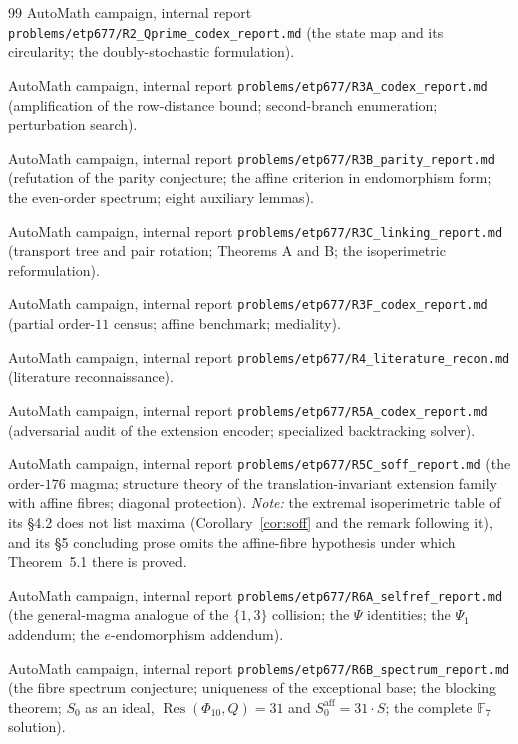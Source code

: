 \documentclass[11pt]{article}
\theoremstyle{plain}
\theoremstyle{definition}
\theoremstyle{remark}
\numberwithin{equation}{section}
\newcommand{\F}{\mathbb{F}}
\begin{document}
\begin{thebibliography}{99}
AutoMath campaign, internal report \texttt{problems\slash etp677\slash R2\_Qprime\_codex\_report.md}
(the state map and its circularity; the doubly-stochastic formulation).

AutoMath campaign, internal report \texttt{problems\slash etp677\slash R3A\_codex\_report.md}
(amplification of the row-distance bound; second-branch enumeration; perturbation search).

AutoMath campaign, internal report \texttt{problems\slash etp677\slash R3B\_parity\_report.md}
(refutation of the parity conjecture; the affine criterion in endomorphism form; the
even-order spectrum; eight auxiliary lemmas).

AutoMath campaign, internal report \texttt{problems\slash etp677\slash R3C\_linking\_report.md}
(transport tree and pair rotation; Theorems A and B; the isoperimetric reformulation).

AutoMath campaign, internal report \texttt{problems\slash etp677\slash R3F\_codex\_report.md}
(partial order-$11$ census; affine benchmark; mediality).

AutoMath campaign, internal report \texttt{problems\slash etp677\slash R4\_literature\_recon.md}
(literature reconnaissance).

AutoMath campaign, internal report \texttt{problems\slash etp677\slash R5A\_codex\_report.md}
(adversarial audit of the extension encoder; specialized backtracking solver).

AutoMath campaign, internal report \texttt{problems\slash etp677\slash R5C\_soff\_report.md}
(the order-$176$ magma; structure theory of the translation-invariant extension family with
affine fibres; diagonal protection). \emph{Note:} the extremal isoperimetric table of its
\S4.2 does not list maxima (Corollary~\ref{cor:soff} and the remark following it), and its
\S5 concluding prose omits the affine-fibre hypothesis under which Theorem~5.1 there is
proved.

AutoMath campaign, internal report \texttt{problems\slash etp677\slash R6A\_selfref\_report.md}
(the general-magma analogue of the $\{1,3\}$ collision; the $\Psi$ identities; the
$\Psi_1$ addendum; the $e$-endomorphism addendum).

AutoMath campaign, internal report \texttt{problems\slash etp677\slash R6B\_spectrum\_report.md}
(the fibre spectrum conjecture; uniqueness of the exceptional base; the blocking
theorem; $S_0$ as an ideal, $\operatorname{Res}(\Phi_{10},Q) = 31$ and
$S_0^{\mathrm{aff}} = 31\cdot S$; the complete $\F_7$ solution).


\end{thebibliography}
\end{document}
